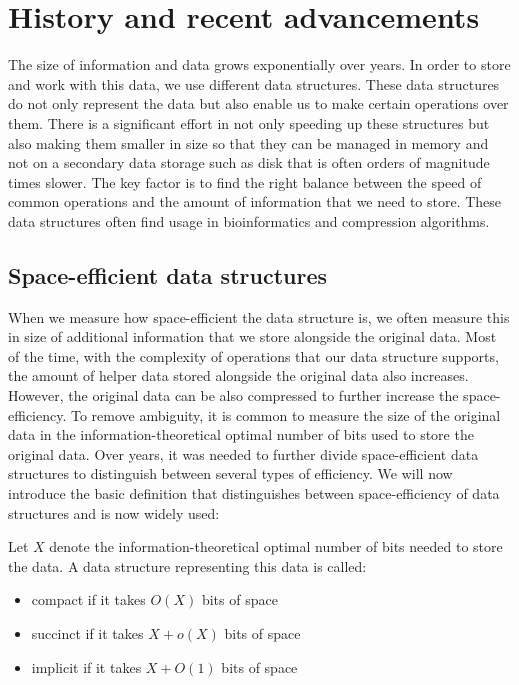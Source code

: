 \chapter{History and recent advancements}
\label{kap:kap1}

The size of information and data grows exponentially over years. In order to store and work with this data, we use different data structures. These data structures do not only represent the data but also enable us to make certain operations over them. There is a significant effort in not only speeding up these structures but also making them smaller in size so that they can be managed in memory and not on a secondary data storage such as disk that is often orders of magnitude times slower. The key factor is to find the right balance between the speed of common operations and the amount of information that we need to store. These data structures often find usage in bioinformatics and compression algorithms.

\section{Space-efficient data structures}

When we measure how space-efficient the data structure is, we often measure this in size of additional information that we store alongside the original data. Most of the time, with the complexity of operations that our data structure supports, the amount of helper data stored alongside the original data also increases. However, the original data can be also compressed to further increase the space-efficiency. To remove ambiguity, it is common to measure the size of the original data in the information-theoretical optimal number of bits used to store the original data. Over years, it was needed to further divide space-efficient data structures to distinguish between several types of efficiency. We will now introduce the basic definition that distinguishes between space-efficiency of data structures and is now widely used:

\begin{theorem}
Let $X$ denote the information-theoretical optimal number of bits needed to store the data. A data structure representing this data is called:
\begin{itemize}
    \item compact if it takes $O(X)$ bits of space
    \item succinct if it takes $X + o(X)$ bits of space
    \item implicit if it takes $X + O(1)$ bits of space
\end{itemize}
\end{theorem}

